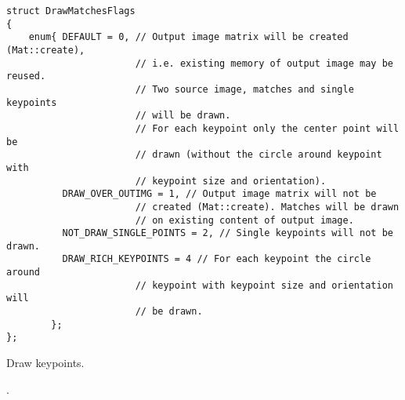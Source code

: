 \begin{lstlisting}
struct DrawMatchesFlags
{
    enum{ DEFAULT = 0, // Output image matrix will be created (Mat::create),
                       // i.e. existing memory of output image may be reused.
                       // Two source image, matches and single keypoints 
                       // will be drawn.
                       // For each keypoint only the center point will be 
                       // drawn (without the circle around keypoint with 
                       // keypoint size and orientation).
          DRAW_OVER_OUTIMG = 1, // Output image matrix will not be 
                       // created (Mat::create). Matches will be drawn 
                       // on existing content of output image.
          NOT_DRAW_SINGLE_POINTS = 2, // Single keypoints will not be drawn.
          DRAW_RICH_KEYPOINTS = 4 // For each keypoint the circle around 
                       // keypoint with keypoint size and orientation will 
                       // be drawn.
        };
};
\end{lstlisting}

Draw keypoints.


\begin{description}
. 
\end{description}

\fi
